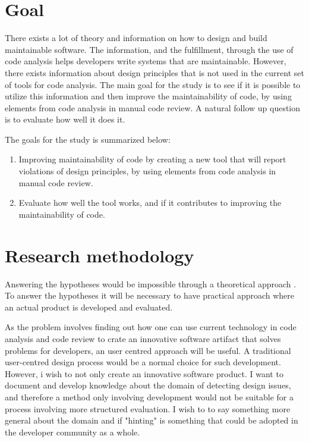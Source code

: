 \documentclass{report}
\begin{document}
\section{Goal}

There exists a lot of theory and information on how to design and build maintainable software. The information, and the fulfillment, through the use of code analysis helps developers write systems that are maintainable. However, there exists information about design principles that is not used in the current set of tools for code analysis. The main goal for the study is to see if it is possible to utilize this information and then improve the maintainability of code, by using elements from code analysis in manual code review. A natural follow up question is to evaluate how well it does it.

The goals for the study is summarized below:

\begin{enumerate}
    \item Improving maintainability of code by creating a new tool that will report violations of design principles, by using elements from code analysis in manual code review.
    \item Evaluate how well the tool works, and if it contributes to improving the maintainability of code. 
\end{enumerate}

\section{Research methodology}
Answering the hypotheses would be impossible through a theoretical approach . To answer the hypotheses it will be necessary to have practical approach where an actual product is developed and evaluated. 



As the problem involves finding out how one can use current technology in code analysis and code review to crate an innovative software artifact that solves problems for developers, an user centred approach will be useful. A traditional user-centred design process would be a normal choice for such development. However, i wish to not only create an innovative software product. I want to document and develop knowledge about the domain of detecting design issues, and therefore a method only involving development would not be suitable for a process involving more structured evaluation. I wish to to say something more general about the domain and if "hinting" is something that could be adopted in the developer community as a whole.  
\end{document}
